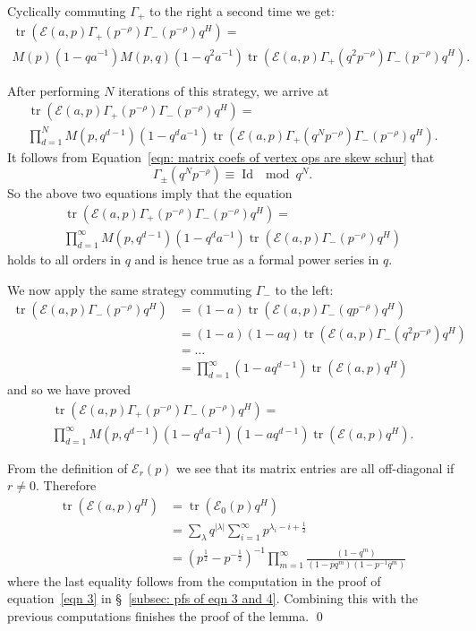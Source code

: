 \documentclass[12pt]{amsart}
\newcommand{\half}{\frac{1}{2}}
\theoremstyle{definition}
\newcommand{\tr}{\operatorname{tr}}
\newcommand{\E}{\mathcal{E}}
\newcommand{\ptotheminusrho}{p^{-\rho}}
\begin{document}
Cyclically commuting $\Gamma_{+}$ to the right a second time we get:
\begin{multline*}
 \tr (\E (a,p)\Gamma_{+}(\ptotheminusrho)\Gamma_{-}(\ptotheminusrho
)q^{H}) = \\
M(p)(1-qa^{-1})M(p,q)(1-q^{2}a^{-1}) \tr (\E (a,p)\Gamma_{+}(q^{2}\ptotheminusrho)\Gamma_{-}(\ptotheminusrho
)q^{H}).
\end{multline*}

After performing $N$ iterations of this strategy, we arrive at
\begin{multline*}
 \tr (\E (a,p)\Gamma_{+}(\ptotheminusrho)\Gamma_{-}(\ptotheminusrho
)q^{H}) = \\
\prod_{d=1}^{N}M(p,q^{d-1})(1-q^{d}a^{-1}) \tr (\E (a,p)\Gamma_{+}(q^{N}\ptotheminusrho)\Gamma_{-}(\ptotheminusrho
)q^{H}).
\end{multline*}
It follows from Equation~\eqref{eqn: matrix coefs of vertex ops are
skew schur} that 
\[
\Gamma_{\pm}(q^{N}\ptotheminusrho )\equiv \operatorname{Id} \mod q^{N}.
\]
So the above two equations imply that the equation
\begin{multline*}
 \tr (\E (a,p)\Gamma_{+}(\ptotheminusrho)\Gamma_{-}(\ptotheminusrho
)q^{H}) = \\
\prod_{d=1}^{\infty }M(p,q^{d-1})(1-q^{d}a^{-1}) \tr (\E (a,p)\Gamma_{-}(\ptotheminusrho
)q^{H})
\end{multline*}
holds to all orders in $q$ and is hence true as a formal power series
in $q$.

We now apply the same strategy commuting $\Gamma_{-}$ to the left:
\begin{align*}
\tr (\E (a,p)\Gamma_{-}(\ptotheminusrho )q^{H}) &=(1-a)\tr (\E (a,p)\Gamma_{-}(q\ptotheminusrho )q^{H}) \\
&=(1-a)(1-aq)\tr (\E (a,p)\Gamma_{-}(q^{2}\ptotheminusrho )q^{H}) \\
&=\dots \\
&=\prod_{d=1}^{\infty}(1-aq^{d-1})\tr (\E (a,p)q^{H})
\end{align*}
and so we have proved
\begin{multline*}
 \tr (\E (a,p)\Gamma_{+}(\ptotheminusrho)\Gamma_{-}(\ptotheminusrho
)q^{H}) = \\
\prod_{d=1}^{\infty }M(p,q^{d-1})(1-q^{d}a^{-1})(1-aq^{d-1})\tr (\E (a,p)q^{H}).
\end{multline*}


From the definition of $\E_{r}(p)$ we see that its matrix entries are
all off-diagonal if $r\neq 0$. Therefore
\begin{align*}
\tr (\E (a,p) q^{H})&=\tr (\E_{0}(p)q^{H})\\
&= \sum_{\lambda} q^{|\lambda |}\sum_{i=1}^{\infty}p^{\lambda_i -i+\half}\\
&=(p^{\half}-p^{-\half})^{-1}\prod_{m=1}^{\infty} \frac{(1-q^{m})}{(1-pq^{m})(1-p^{-1}q^{m})}
\end{align*}
where the last equality follows from the computation in the proof of
equation~\eqref{eqn 3} in \S~\ref{subsec: pfs of eqn 3 and
4}. Combining this with the previous computations finishes the proof
of the lemma. \qed
\end{document}
